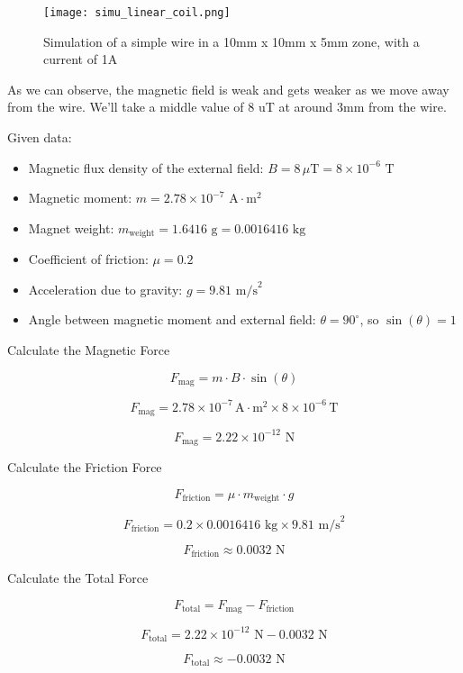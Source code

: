 \begin{figure}[H]
	\centering
	\texttt{[image: simu\_linear\_coil.png]}
	\caption[Simulation of a magnetic field in a simple wire]{Simulation of a simple wire in a 10mm x 10mm x 5mm zone, with a current of 1A}
	\label{fig:simu_simple_wire}
\end{figure}

As we can observe, the magnetic field is weak and gets weaker as we move away from the wire. We'll take a middle value of 8 uT at around 3mm from the wire.

Given data:
\begin{itemize}
	\item Magnetic flux density of the external field: \( B = 8 \, \mu\text{T} = 8 \times 10^{-6} \text{ T} \)
	\item Magnetic moment: \( m = 2.78 \times 10^{-7} \text{ A} \cdot \text{m}^2 \)
	\item Magnet weight: \( m_{\text{weight}} = 1.6416 \text{ g} = 0.0016416 \text{ kg} \)
	\item Coefficient of friction: \( \mu = 0.2 \)
	\item Acceleration due to gravity: \( g = 9.81 \text{ m/s}^2 \)
	\item Angle between magnetic moment and external field: \( \theta = 90^\circ \), so \( \sin(\theta) = 1 \)
\end{itemize}

Calculate the Magnetic Force

\[
	F_{\text{mag}} = m \cdot B \cdot \sin(\theta)
\]

\[
	F_{\text{mag}} = 2.78 \times 10^{-7} \, \text{A} \cdot \text{m}^2 \times 8 \times 10^{-6} \, \text{T}
\]

\[
	F_{\text{mag}} = 2.22 \times 10^{-12} \text{ N}
\]

Calculate the Friction Force

\[
	F_{\text{friction}} = \mu \cdot m_{\text{weight}} \cdot g
\]

\[
	F_{\text{friction}} = 0.2 \times 0.0016416 \text{ kg} \times 9.81 \text{ m/s}^2
\]

\[
	F_{\text{friction}} \approx 0.0032 \text{ N}
\]

Calculate the Total Force

\[
	F_{\text{total}} = F_{\text{mag}} - F_{\text{friction}}
\]

\[
	F_{\text{total}} = 2.22 \times 10^{-12} \text{ N} - 0.0032 \text{ N}
\]

\[
	F_{\text{total}} \approx -0.0032 \text{ N}
\]




